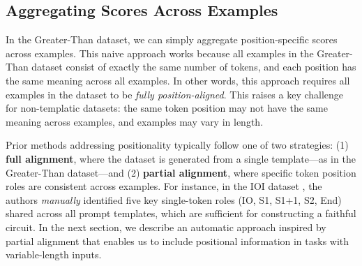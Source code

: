\subsection{Aggregating Scores Across Examples}

In the Greater-Than dataset, we can simply aggregate position-specific scores across examples.
This naive approach works because all examples in the Greater-Than dataset consist of exactly the same number of tokens, and each position has the same meaning across all examples.
In other words, this approach requires all examples in the dataset to be \emph{fully position-aligned}.
This raises a key challenge for non-templatic datasets: the same token position may not have the same meaning across examples, and examples may vary in length.

Prior methods addressing positionality typically follow one of two strategies: 
(1) \textbf{full alignment}, where the dataset is generated from a single template---as in the Greater-Than dataset---and (2) \textbf{partial alignment}, where specific token position roles are consistent across examples.
For instance, in the IOI dataset \citep{wanginterpretability}, the authors \emph{manually} identified five key single-token roles (IO, S1, S1+1, S2, End) shared across all prompt templates, which are sufficient for constructing a faithful circuit. 
In the next section, we describe an automatic approach inspired by partial alignment that  enables us to include positional information in tasks with variable-length inputs.
